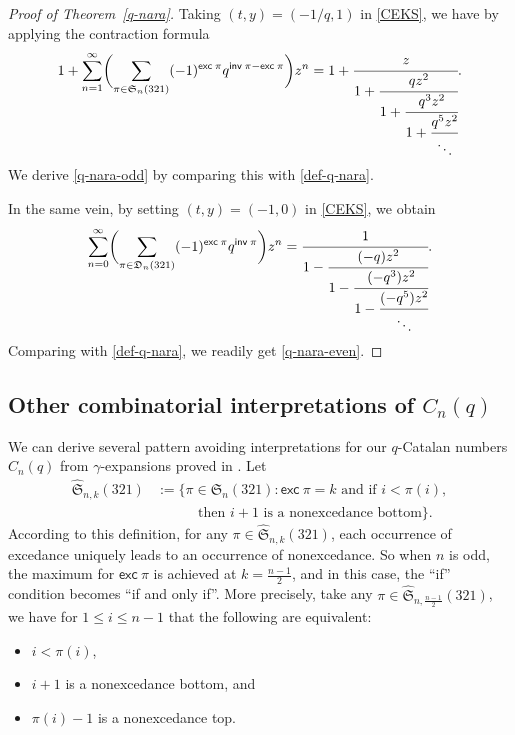 \documentclass[12pt,reqno]{amsart}
\numberwithin{equation}{section}
\theoremstyle{plain}
\theoremstyle{definition}
\def\S{\mathfrak{S}}
\def\D{\mathfrak{D}}
\def\exc{\mathsf{exc}}
\def\inv{\mathsf{inv}}
\begin{document}
\begin{proof}[Proof of Theorem~\ref{q-nara}]
Taking $(t, y)=(-1/q,1)$ in \eqref{CEKS}, we have by applying the contraction formula
\begin{align*}
1+\sum_{n=1}^{\infty} \biggl(\sum_{\pi\in \S_n(321)}(-1)^{\exc\:\pi} q^{\inv\:\pi-\exc\:\pi}\biggr)z^n=1+\cfrac{z}{1+\cfrac{qz^2}{1+\cfrac{q^3z^2}{1+\cfrac{q^5z^2}{\ddots}}}}.
\end{align*}
We derive \eqref{q-nara-odd}  by comparing this with \eqref{def-q-nara}.

In the same vein, by setting $(t, y)=(-1,0)$ in \eqref{CEKS}, we obtain
\begin{align*}
\sum_{n=0}^{\infty}\biggl(\sum\limits_{\pi\in\D_n(321)}(-1)^{\exc\:\pi}q^{\inv\:\pi}\biggr)z^{n}=\cfrac{1}{1-\cfrac{(-q)z^2}{1-\cfrac{(-q^{3})z^{2}}
{1-\cfrac{(-q^5)z^2}{\ddots}}}}.
\end{align*}
Comparing with \eqref{def-q-nara}, we readily get \eqref{q-nara-even}.
\end{proof}

\subsection{Other combinatorial interpretations of \texorpdfstring{$C_n(q)$}{}}
We can derive several pattern avoiding interpretations for
our $q$-Catalan numbers $C_n(q)$ from $\gamma$-expansions proved in \cite{LF17, Lin17}. Let
\begin{align*}
\widehat{\S}_{n,k}(321) &:=\{\pi\in\S_n(321): \exc\:\pi=k\text{ and if } i<\pi(i),\\
&\phantom{==} \text{ then $i+1$ is a nonexcedance bottom}\}.
\end{align*}
According to this definition, for any $\pi\in\widehat{\S}_{n,k}(321)$, each occurrence of excedance uniquely leads to an occurrence of nonexcedance. So when $n$ is odd, the maximum for $\exc\:\pi$ is achieved at $k=\frac{n-1}{2}$, and in this case, the ``if'' condition becomes ``if and only if''. More precisely, take any $\pi\in\widehat{\S}_{n,\frac{n-1}{2}}(321)$, we have for $1\le i\le n-1$ that the following are equivalent:
\begin{itemize}
    \item $i<\pi(i)$,
    \item $i+1$ is a nonexcedance bottom, and
    \item $\pi(i)-1$ is a nonexcedance top.
\end{itemize}
\end{document}
